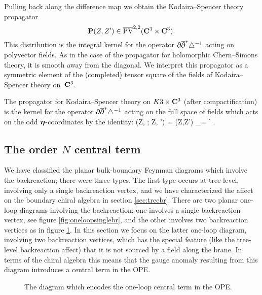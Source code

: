 \documentclass[../main.tex]{subfiles}
\begin{document}
Pulling back along the difference map we obtain the Kodaira--Spencer theory propagator
\[
\mathbf{P} (Z,Z') \in \overline{{\rm PV}}^{2,2}(\mathbf{C}^3 \times \mathbf{C}^3) .
\]
This distribution is the integral kernel for the operator $\partial \overline{\partial}^* \triangle^{-1}$ acting on polyvector fields. 
As in the case of the propagator for holomorphic Chern--Simons theory, it is smooth away from the diagonal. 
We interpret this propagator as a symmetric element of the (completed) tensor square of the fields of Kodaira--Spencer theory on~$\mathbf{C}^3$. 

The propagator for Kodaira--Spencer theory on $K3 \times \mathbf{C}^3$ (after compactification) is the kernel for the operator $\partial \overline{\partial}^* \triangle^{-1}$ acting on the full space of fields which acts on the odd $\boldsymbol\eta$-coordinates by the identity:
\beqn
\bP(Z, \bfeta ; Z, \bfeta') = \bP(Z,Z') \delta_{\bfeta = \bfeta'} .
\eeqn

\subsection{The order $N$ central term} 
\label{sec:oneloop}

We have classified the planar bulk-boundary Feynman diagrams which involve the backreaction; there were three types.
The first type occurs at tree-level, involving only a single backreaction vertex, and we have characterized the affect on the boundary chiral algebra in section \ref{sec:treebr}.
There are two planar one-loop diagrams involving the backreaction: one involves a single backreaction vertex, see figure \ref{fig:oneloopsinglebr}, and the other involves two backreaction vertices as in figure \ref{fig:orderN}.
In this section we focus on the latter one-loop diagram, involving two backreaction vertices, which has the special feature (like the tree-level backreaction affect) that it is not sourced by a field along the brane.
In terms of the chiral algebra this means that the gauge anomaly resulting from this diagram introduces a central term in the OPE.

\begin{figure}
	\label{fig:orderN}
	\caption{The diagram which encodes the one-loop central term in the OPE.}  
\end{figure}
\end{document}
